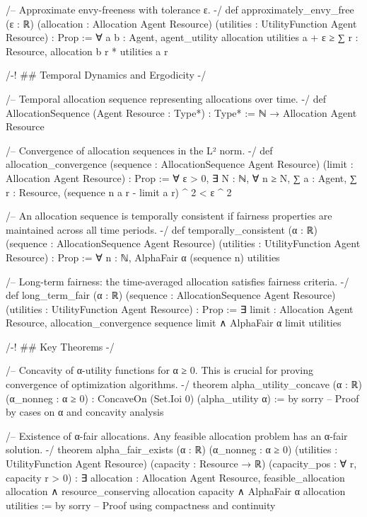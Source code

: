 /--
Approximate envy-freeness with tolerance ε.
-/
def approximately_envy_free (ε : ℝ) (allocation : Allocation Agent Resource)
    (utilities : UtilityFunction Agent Resource) : Prop :=
  ∀ a b : Agent,
    agent_utility allocation utilities a + ε ≥
    ∑ r : Resource, allocation b r * utilities a r

/-! ## Temporal Dynamics and Ergodicity -/

/--
Temporal allocation sequence representing allocations over time.
-/
def AllocationSequence (Agent Resource : Type*) : Type* := 
  ℕ → Allocation Agent Resource

/--
Convergence of allocation sequences in the L² norm.
-/
def allocation_convergence (sequence : AllocationSequence Agent Resource) 
    (limit : Allocation Agent Resource) : Prop :=
  ∀ ε > 0, ∃ N : ℕ, ∀ n ≥ N,
    ∑ a : Agent, ∑ r : Resource, (sequence n a r - limit a r) ^ 2 < ε ^ 2

/--
An allocation sequence is temporally consistent if fairness properties
are maintained across all time periods.
-/
def temporally_consistent (α : ℝ) (sequence : AllocationSequence Agent Resource)
    (utilities : UtilityFunction Agent Resource) : Prop :=
  ∀ n : ℕ, AlphaFair α (sequence n) utilities

/--
Long-term fairness: the time-averaged allocation satisfies fairness criteria.
-/
def long_term_fair (α : ℝ) (sequence : AllocationSequence Agent Resource)
    (utilities : UtilityFunction Agent Resource) : Prop :=
  ∃ limit : Allocation Agent Resource,
    allocation_convergence sequence limit ∧
    AlphaFair α limit utilities

/-! ## Key Theorems -/

/--
Concavity of α-utility functions for α ≥ 0.
This is crucial for proving convergence of optimization algorithms.
-/
theorem alpha_utility_concave (α : ℝ) (α_nonneg : α ≥ 0) : 
    ConcaveOn (Set.Ioi 0) (alpha_utility α) := by
  sorry -- Proof by cases on α and concavity analysis

/--
Existence of α-fair allocations.
Any feasible allocation problem has an α-fair solution.
-/
theorem alpha_fair_exists (α : ℝ) (α_nonneg : α ≥ 0) 
    (utilities : UtilityFunction Agent Resource)
    (capacity : Resource → ℝ) (capacity_pos : ∀ r, capacity r > 0) :
    ∃ allocation : Allocation Agent Resource,
      feasible_allocation allocation ∧
      resource_conserving allocation capacity ∧
      AlphaFair α allocation utilities := by
  sorry -- Proof using compactness and continuity

